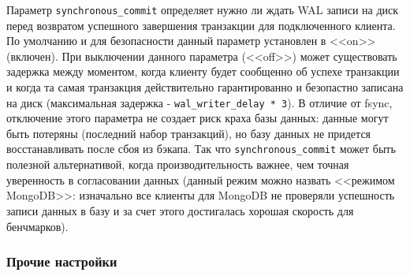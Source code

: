 Параметр \lstinline!synchronous_commit! определяет нужно ли ждать WAL записи на диск перед возвратом успешного завершения транзакции для подключенного клиента. По умолчанию и для безопасности данный параметр установлен в <<on>> (включен). При выключении данного параметра (<<off>>) может существовать задержка между моментом, когда клиенту будет сообщенно об успехе транзакции и когда та самая транзакция действительно гарантированно и безопастно записана на диск (максимальная задержка - \lstinline!wal_writer_delay * 3!). В отличие от fsync, отключение этого параметра не создает риск краха базы данных: данные могут быть потеряны (последний набор транзакций), но базу данных не придется восстанавливать после сбоя из бэкапа. Так что \lstinline!synchronous_commit! может быть полезной альтернативой, когда производительность важнее, чем точная уверенность в согласовании данных (данный режим можно назвать <<режимом MongoDB>>: изначально все клиенты для MongoDB не проверяли успешность записи данных в базу и за счет этого достигалась хорошая скорость для бенчмарков).

\subsubsection{Прочие настройки}

